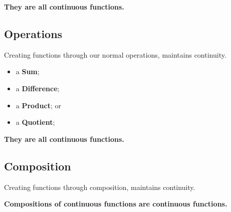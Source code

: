 \documentclass{ximera}
\begin{document}
\begin{center}
\textbf{\textcolor{blue!55!black}{They are all continuous functions.}}   \\
\end{center}

















\subsection*{Operations}


Creating functions through our normal operations, maintains continuity. \\

\begin{itemize}
	\item a \textbf{Sum};
	\item a \textbf{Difference};
	\item a \textbf{Product}; or 
	\item a \textbf{Quotient};
\end{itemize}


\begin{center}
\textbf{\textcolor{blue!55!black}{They are all continuous functions.}}   \\
\end{center}












\subsection*{Composition}


Creating functions through composition, maintains continuity. \\





\begin{center}
\textbf{\textcolor{blue!55!black}{Compositions of continuous functions are continuous functions.}}   \\
\end{center}
\end{document}

